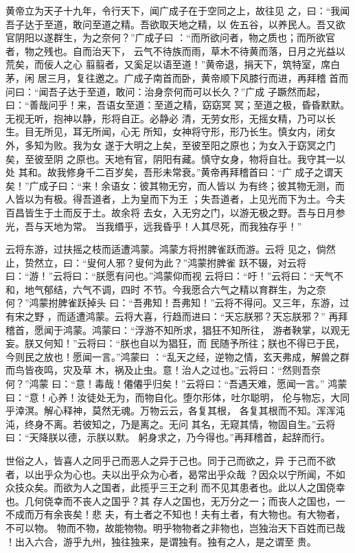 \documentclass[a4paper,12pt,UTF8,twoside]{ctexbook}
\begin{document}
黄帝立为天子十九年，令行天下，闻广成子在于空同之上，故往见 之，曰：“我闻吾子达于至道，敢问至道之精。吾欲取天地之精，以 佐五谷，以养民人。吾又欲官阴阳以遂群生，为之奈何？”广成子曰 ：“而所欲问者，物之质也；而所欲官者，物之残也。自而治天下， 云气不待族而雨，草木不待黄而落，日月之光益以荒矣，而佞人之心 翦翦者，又奚足以语至道！”黄帝退，捐天下，筑特室，席白茅，闲 居三月，复往邀之。广成子南首而卧，黄帝顺下风膝行而进，再拜稽 首而问曰：“闻吾子达于至道，敢问：治身奈何而可以长久？”广成 子蹶然而起，曰：“善哉问乎！来，吾语女至道：至道之精，窈窈冥 冥；至道之极，昏昏默默。无视无听，抱神以静，形将自正。必静必 清，无劳女形，无摇女精，乃可以长生。目无所见，耳无所闻，心无 所知，女神将守形，形乃长生。慎女内，闭女外，多知为败。我为女 遂于大明之上矣，至彼至阳之原也；为女入于窈冥之门矣，至彼至阴 之原也。天地有官，阴阳有藏。慎守女身，物将自壮。我守其一以处 其和。故我修身千二百岁矣，吾形未常衰。”黄帝再拜稽首曰：“广 成子之谓天矣！”广成子曰：“来！余语女：彼其物无穷，而人皆以 为有终；彼其物无测，而人皆以为有极。得吾道者，上为皇而下为王 ；失吾道者，上见光而下为土。今夫百昌皆生于土而反于土。故余将 去女，入无穷之门，以游无极之野。吾与日月参光，吾与天地为常。 当我缗乎，远我昏乎！人其尽死，而我独存乎！”

云将东游，过扶摇之枝而适遭鸿蒙。鸿蒙方将拊脾雀跃而游。云将 见之，倘然止，贽然立，曰：“叟何人邪？叟何为此？”鸿蒙拊脾雀 跃不辍，对云将曰：“游！”云将曰：“朕愿有问也。”鸿蒙仰而视 云将曰：“吁！”云将曰：“天气不和，地气郁结，六气不调，四时 不节。今我愿合六气之精以育群生，为之奈何？”鸿蒙拊脾雀跃掉头 曰：“吾弗知！吾弗知！”云将不得问。又三年，东游，过有宋之野 ，而适遭鸿蒙。云将大喜，行趋而进曰：“天忘朕邪？天忘朕邪？” 再拜稽首，愿闻于鸿蒙。鸿蒙曰：“浮游不知所求，猖狂不知所往， 游者鞅掌，以观无妄。朕又何知！”云将曰：“朕也自以为猖狂，而 民随予所往；朕也不得已于民，今则民之放也！愿闻一言。”鸿蒙曰 ：“乱天之经，逆物之情，玄天弗成，解兽之群而鸟皆夜鸣，灾及草 木，祸及止虫。意！治人之过也。”云将曰：“然则吾奈何？”鸿蒙 曰：“意！毒哉！僊僊乎归矣！”云将曰：“吾遇天难，愿闻一言。” 鸿蒙曰：“意！心养！汝徒处无为，而物自化。堕尔形体，吐尔聪明， 伦与物忘，大同乎涬溟。解心释神，莫然无魂。万物云云，各复其根， 各复其根而不知。浑浑沌沌，终身不离。若彼知之，乃是离之。无问 其名，无窥其情，物固自生。”云将曰：“天降朕以德，示朕以默。 躬身求之，乃今得也。”再拜稽首，起辞而行。

世俗之人，皆喜人之同乎己而恶人之异于己也。同于己而欲之，异 于己而不欲者，以出乎众为心也。夫以出乎众为心者，曷常出乎众哉 ？因众以宁所闻，不如众技众矣。而欲为人之国者，此揽乎三王之利 而不见其患者也。此以人之国侥幸也。几何侥幸而不丧人之国乎？其 存人之国也，无万分之一；而丧人之国也，一不成而万有余丧矣！悲 夫，有土者之不知也！夫有土者，有大物也。有大物者，不可以物。 物而不物，故能物物。明乎物物者之非物也，岂独治天下百姓而已哉 ！出入六合，游乎九州，独往独来，是谓独有。独有之人，是之谓至 贵。
\end{document}

